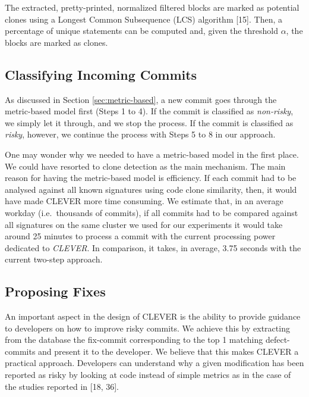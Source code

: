 \documentclass[sigconf]{acmart}
\begin{document}


The extracted, pretty-printed, normalized filtered blocks are marked as
potential clones using a Longest Common Subsequence (LCS) algorithm
[15]. Then, a percentage of unique statements can be computed and,
given the threshold \(\alpha\), the blocks are marked as clones.

\subsection{Classifying Incoming
Commits}\label{classifying-incoming-commits}

As discussed in Section \ref{sec:metric-based}, a new commit goes
through the metric-based model first (Steps 1 to 4). If the commit is
classified as \emph{non-risky}, we simply let it through, and we stop
the process. If the commit is classified as \emph{risky}, however, we
continue the process with Steps 5 to 8 in our approach.

One may wonder why we needed to have a metric-based model in the first
place. We could have resorted to clone detection as the main mechanism.
The main reason for having the metric-based model is efficiency. If each
commit had to be analysed against all known signatures using code clone
similarity, then, it would have made CLEVER more time consuming. We
estimate that, in an average workday (i.e.~thousands of commits), if all
commits had to be compared against all signatures on the same cluster we
used for our experiments it would take around 25 minutes to process a
commit with the current processing power dedicated to \emph{CLEVER}. In
comparison, it takes, in average, 3.75 seconds with the current two-step
approach.

\subsection{Proposing Fixes}\label{proposing-fixes}

An important aspect in the design of CLEVER is the ability to provide
guidance to developers on how to improve risky commits. We achieve this
by extracting from the database the fix-commit corresponding to the top
1 matching defect-commits and present it to the developer. We believe
that this makes CLEVER a practical approach. Developers can understand
why a given modification has been reported as risky by looking at code
instead of simple metrics as in the case of the studies reported in
[18, 36].
\end{document}

